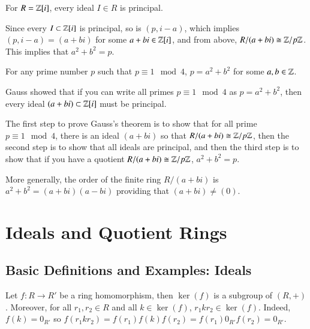 \documentclass[12pt, a4paper, oneside, openright, titlepage]{book}
\begin{document}
\begin{thm}
        For $R = \mathbb Z[i]$, every ideal $I \in R$ is principal.
\end{thm}

\begin{cor}
        Since every $I \subset \mathbb Z[i]$ is principal, so is $(p,i-a)$, which implies $(p,i-a) = (a+bi)$ for some $a+bi \in \mathbb Z[i]$, and from above, $R/(a+bi) \cong \mathbb Z/p\mathbb Z$. This implies that $a^2+b^2 = p$.
\end{cor}


\begin{thm}
        For any prime number $p$ such that $p \equiv 1 \mod 4$, $p = a^2 + b^2$ for some $a,b \in \mathbb Z$.
\end{thm}


\begin{rmk}
        Gauss showed that if you can write all primes $p\equiv 1 \mod 4$ as $p = a^2 +b^2$, then every ideal $(a+bi) \subset \mathbb Z[i]$ must be principal.
\end{rmk}

\begin{rmk}
        The first step to prove Gauss's theorem is to show that for all prime $p\equiv 1 \mod 4$, there is an ideal $(a+bi)$ so that $R/(a+bi) \cong \mathbb Z/p\mathbb Z$, then the second step is to show that all ideals are principal, and then the third step is to show that if you have a quotient $R/(a+bi) \cong \mathbb Z/p\mathbb Z$, $a^2+b^2 = p$.
\end{rmk}


\begin{rmk}
        More generally, the order of the finite ring $R/(a+bi)$ is $a^2+b^2 = (a+bi)(a-bi)$ providing that $(a+bi) \neq (0)$.
\end{rmk}



\chapter{\textsection\textsection Ideals and Quotient Rings}

\section{\textsection Basic Definitions and Examples: Ideals}


\begin{rmk}
    Let $f:R\rightarrow R'$ be a ring homomorphism, then $\ker(f)$ is a subgroup of $(R,+)$. Moreover, for all $r_1,r_2 \in R$ and all $k \in \ker(f)$, $r_1kr_2 \in \ker(f)$. Indeed, $f(k) = 0_{R'}$ so $f(r_1kr_2) = f(r_1)f(k)f(r_2) = f(r_1)0_{R'}f(r_2) = 0_{R'}$.
\end{rmk}
\end{document}
